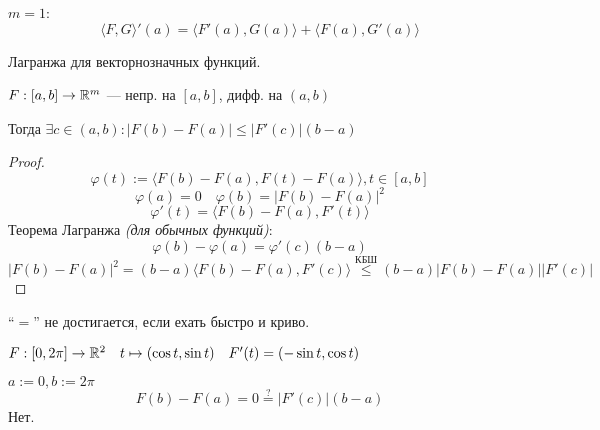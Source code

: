 \begin{remark}
    $m=1$:
    $$\langle F,G\rangle'(a) = \langle F'(a), G(a) \rangle + \langle F(a), G'(a) \rangle$$
\end{remark}

\begin{theorem}
    Лагранжа для векторнозначных функций.

    $F:[a,b]\to\mathbb{R}^m$ --- непр. на $[a,b]$, дифф. на $(a, b)$

    Тогда $\exists c\in(a,b) : |F(b) - F(a)| \le |F'(c)|(b-a)$
\end{theorem}
\begin{proof}
    $$\varphi(t):=\langle F(b) - F(a), F(t) - F(a)\rangle, t\in[a,b]$$
    $$\varphi(a) = 0 \quad \varphi(b) = |F(b) - F(a)|^2$$
    $$\varphi'(t) = \langle F(b) - F(a), F'(t)\rangle$$
    Теорема Лагранжа \textit{(для обычных функций)}:
    $$\varphi(b)-\varphi(a)=\varphi'(c)(b-a)$$
    $$|F(b)-F(a)|^2=(b-a)\langle F(b) - F(a), F'(c)\rangle \stackrel{\text{КБШ}}{\le} (b-a)|F(b)-F(a)||F'(c)|$$
\end{proof}

\begin{remark}
    ``$=$'' не достигается, если ехать быстро и криво. %
\end{remark}
\begin{example}
    $F:[0, 2\pi]\to\mathbb{R}^2 \quad t\mapsto (\cos t, \sin t) \quad F'(t)=(-\sin t, \cos t)$

    $a:=0, b:=2\pi$
    $$F(b)-F(a)=0\stackrel{?}{=}|F'(c)|(b-a)$$
    Нет.
\end{example}

